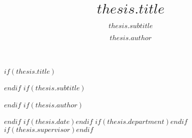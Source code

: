 $if(thesis.title)$\title{$thesis.title$}$endif$
$if(thesis.subtitle)$\subtitle{$thesis.subtitle$}$endif$
$if(thesis.author)$\author{$thesis.author$}$endif$
$if(thesis.date)$$endif$
$if(thesis.department)$$endif$
$if(thesis.supervisor)$$endif$